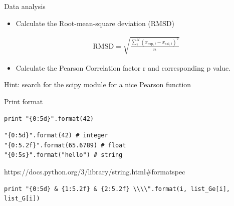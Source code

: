 \documentclass{beamer}
\begin{document}
\begin{frame}[fragile]

    Data analysis

    \begin{itemize}
        \item Calculate the Root-mean-square deviation (RMSD)

        \begin{align*}
            \mathrm{RMSD} = \sqrt{\frac{\sum_i^N (x_{\mathrm{exp},i}-x_{\mathrm{cal},i})^2 }{n}}
        \end{align*}

    \end{itemize}

    \begin{itemize}
        \item Calculate the Pearson Correlation factor r and corresponding p value.
    \end{itemize}

    Hint: search for the scipy module for a nice Pearson function

\end{frame}


\begin{frame}[fragile]
    Print format

\begin{lstlisting}
print "{0:5d}".format(42)
\end{lstlisting}

\begin{lstlisting}
"{0:5d}".format(42) # integer
"{0:5.2f}".format(65.6789) # float
"{0:5s}".format("hello") # string
\end{lstlisting}

https://docs.python.org/3/library/string.html\#formatspec

\begin{lstlisting}
print "{0:5d} & {1:5.2f} & {2:5.2f} \\\\".format(i, list_Ge[i], list_G[i])
\end{lstlisting}


\end{frame}
\end{document}
